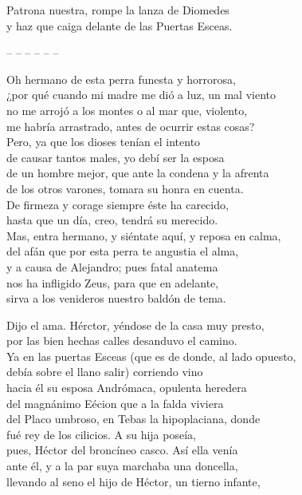 Patrona nuestra, rompe la lanza de Diomedes\\
y haz que caiga delante de las Puertas Esceas.\par
\pend
\noindent-- -- -- -- -- --\par
%
\pstart
{}
Oh hermano de esta perra funesta y horrorosa,\\
¿por qué cuando mi madre me dió a luz, un mal viento\\
no me arrojó a los montes o al mar que, violento,\\
me habría arrastrado, antes de ocurrir estas cosas?\\
Pero, ya que los dioses tenían el intento\\
de causar tantos males, yo debí ser la esposa\\
de un hombre mejor, que ante la condena y la afrenta\\
de los otros varones, tomara su honra en cuenta.\\
De firmeza y corage siempre éste ha carecido,\\
hasta que un día, creo, tendrá su merecido.\\
Mas, entra hermano, y siéntate aquí, y reposa en calma,\\
del afán que por esta perra te angustia el alma,\\
y a causa de Alejandro; pues fatal anatema\\
nos ha infligido Zeus, para que en adelante,\\
sirva a los venideros nuestro baldón de tema.\par
\pend
\separator
%
\pstart
{}
Dijo el ama. Hérctor, yéndose de la casa muy presto,\\
por las bien hechas calles desanduvo el camino.\\
Ya en las puertas Esceas (que es de donde, al lado opuesto,\\
debía sobre el llano salir) corriendo vino\\
hacia él su esposa Andrómaca, opulenta heredera\\
del magnánimo Eécion que a la falda viviera\\
del Placo umbroso, en Tebas la hipoplaciana, donde\\
fué rey de los cilicios. A su hija poseía,\\
pues, Héctor del broncíneo casco. Así ella venía\\
ante él, y a la par suya marchaba una doncella,\\
llevando al seno el hijo de Héctor, un tierno infante,\\
